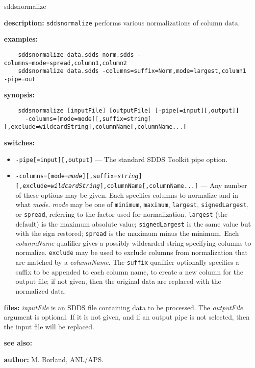 \begin{sddsprog}{sddsnormalize}
  \item \textbf{description:} \verb|sddsnormalize| performs various normalizations of column data.
  \item \textbf{examples:}
    \begin{verbatim}
    sddsnormalize data.sdds norm.sdds -columns=mode=spread,column1,column2
    sddsnormalize data.sdds -columns=suffix=Norm,mode=largest,column1 -pipe=out
    \end{verbatim}
  \item \textbf{synopsis:}
    \begin{verbatim}
    sddsnormalize [inputFile] [outputFile] [-pipe[=input][,output]]
      -columns=[mode=mode][,suffix=string][,exclude=wildcardString],columnName[,columnName...]
    \end{verbatim}
  \item \textbf{switches:}
    \begin{itemize}
      \item {\tt -pipe[=input][,output]} --- The standard SDDS Toolkit pipe option.
      \item {\tt -columns=[mode={\em mode}][,suffix={\em string}][,exclude={\em wildcardString}],columnName[,columnName...]} ---
        Any number of these options may be given. Each specifies columns to normalize and in what {\em mode}. {\em mode} may be
        one of {\tt minimum}, {\tt maximum}, {\tt largest}, {\tt signedLargest}, or {\tt spread}, referring to the factor used for normalization.
        {\tt largest} (the default) is the maximum absolute value; {\tt signedLargest} is the same value but with the sign restored;
        {\tt spread} is the maximum minus the minimum. Each {\em columnName} qualifier gives a possibly wildcarded string specifying
        columns to normalize. {\tt exclude} may be used to exclude columns from normalization that are matched by a {\em columnName}.
        The {\tt suffix} qualifier optionally specifies a suffix to be appended to each column name, to create a new column for the output file; if not given, then the original data are replaced with the normalized data.
    \end{itemize}
  \item \textbf{files:} \emph{inputFile} is an SDDS file containing data to be processed. The \emph{outputFile} argument is optional. If it is not given, and if an output pipe is not selected, then the input file will be replaced.
  \item \textbf{see also:} 
  \item \textbf{author:} M. Borland, ANL/APS.
\end{sddsprog}
